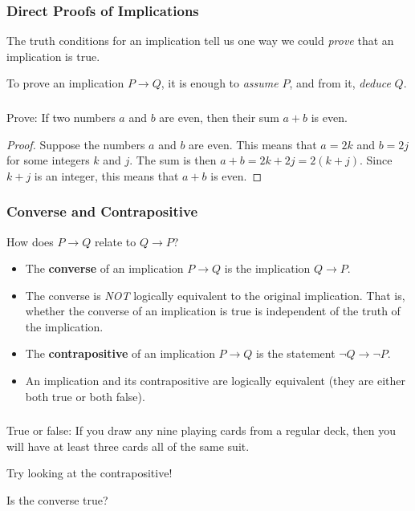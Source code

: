 \documentclass[11pt, compress]{beamer}
\newcommand{\terminology}[1]{\textbf{#1}}\newcommand{\lt}{<}
\newcommand{\imp}{\rightarrow}
\begin{document}
\begin{frame}
\frametitle{Direct Proofs of Implications}
 The truth conditions for an implication tell us one way we could \emph{prove} that an implication is true.
 
\pause 

To prove an implication \(P \imp Q\), it is enough to \emph{assume} \(P\), and from it, \emph{deduce} \(Q\).
\end{frame}
 
\begin{frame}
\frametitle{}
\begin{example}[0.2.4]Prove: If two numbers \(a\) and \(b\) are even, then their sum \(a+b\) is even.
\end{example}
 \begin{proof}
\pause 

Suppose the numbers \(a\) and \(b\) are even. This means that \(a = 2k\) and \(b=2j\) for some integers \(k\) and \(j\). The sum is then \(a+b = 2k+2j = 2(k+j)\). Since \(k+j\) is an integer, this means that \(a+b\) is even.
\end{proof}\end{frame}
 
\begin{frame}
\frametitle{Converse and Contrapositive}
 How does \(P \imp Q\) relate to \(Q \imp P\)?
\pause 

\begin{itemize}[<+->]
\item{} The \terminology{converse}  of an implication \(P \imp Q\) is the implication \(Q \imp P\).


\item{} The converse is \emph{NOT} logically equivalent to the original implication. That is, whether the converse of an implication is true is independent of the truth of the implication.


\item{} The \terminology{contrapositive} of an implication \(P \imp Q\) is the statement \(\neg Q \imp \neg P\).


\item{} An implication and its contrapositive are logically equivalent (they are either both true or both false).

\end{itemize}

\end{frame}
 
\begin{frame}
\frametitle{}
\begin{example}[0.2.5]True or false: If you draw any nine playing cards from a regular deck, then you will have at least three cards all of the same suit.

\pause 

Try looking at the contrapositive!

\pause 

Is the converse true?
\end{example}
\end{frame}
 
\end{document}
